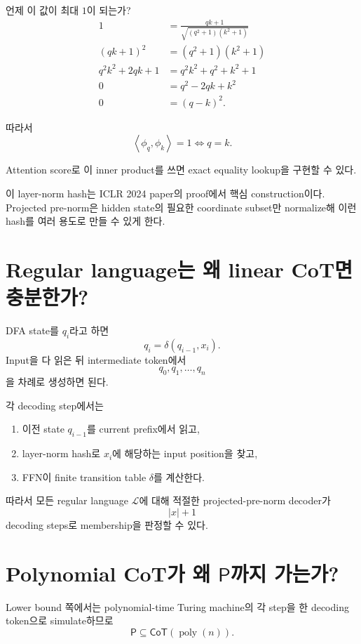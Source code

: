 \documentclass[11pt,a4paper,oneside,openany]{memoir}
\newcommand{\inner}[2]{\left\langle #1,#2\right\rangle}
\theoremstyle{definition}
\newcommand{\poly}{\operatorname{poly}}
\newcommand{\CoT}{\mathsf{CoT}}
\newcommand{\Pclass}{\mathsf{P}}
\begin{document}
언제 이 값이 최대 $1$이 되는가?
\begin{align*}
1
&=
\frac{qk+1}{\sqrt{(q^2+1)(k^2+1)}}\\
(qk+1)^2
&=(q^2+1)(k^2+1)\\
q^2k^2+2qk+1
&=q^2k^2+q^2+k^2+1\\
0&=q^2-2qk+k^2\\
0&=(q-k)^2.
\end{align*}

따라서
\[
\boxed{\inner{\phi_q}{\phi_k}=1\iff q=k.}
\]

Attention score로 이 inner product를 쓰면 exact equality lookup을 구현할 수 있다.

\begin{paperbox}
이 layer-norm hash는 ICLR 2024 paper의 proof에서 핵심 construction이다. Projected pre-norm은 hidden state의 필요한 coordinate subset만 normalize해 이런 hash를 여러 용도로 만들 수 있게 한다.
\end{paperbox}

\section{Regular language는 왜 linear CoT면 충분한가?}

DFA state를 $q_i$라고 하면
\[
q_i=\delta(q_{i-1},x_i).
\]
Input을 다 읽은 뒤 intermediate token에서
\[
q_0,q_1,\dots,q_n
\]
을 차례로 생성하면 된다.

각 decoding step에서는
\begin{enumerate}
  \item 이전 state $q_{i-1}$를 current prefix에서 읽고,
  \item layer-norm hash로 $x_i$에 해당하는 input position을 찾고,
  \item FFN이 finite transition table $\delta$를 계산한다.
\end{enumerate}

따라서 모든 regular language $\mathcal L$에 대해 적절한 projected-pre-norm decoder가
\[
|x|+1
\]
decoding steps로 membership을 판정할 수 있다.

\section{\texorpdfstring{Polynomial CoT가 왜 $\Pclass$까지 가는가?}{Polynomial CoT가 왜 P까지 가는가?}}

Lower bound 쪽에서는 polynomial-time Turing machine의 각 step을 한 decoding token으로 simulate하므로
\[
\Pclass\subseteq \CoT(\poly(n)).
\]
\end{document}
